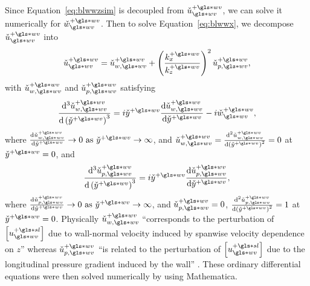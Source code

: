 Since Equation~\eqref{eq:blwwzsim} is decoupled from $\check{u}\pw\ww$, we can solve it numerically for $\check{w}\pw\ww$. Then to solve Equation~\eqref{eq:blwwx}, we decompose $\check{u}\pw\ww$ into
\begin{equation}
	\check{u}\pw\ww = \check{u}\pw_{w,\gls*{wv}}+\left( \frac{k_x\pw}{k_z\pw} \right) ^2\check{u}\pw_{p,\gls*{wv}}
,\end{equation}
with $\check{u}\pw_{w,\gls*{wv}}$ and $\check{u}\pw_{p,\gls*{wv}}$ satisfying
\begin{equation}
\dv[3]{\check{u}\pw_{w,\gls*{wv}}}{\left( \check{y}\pw \right) } =i\check{y}\pw \dv{\check{u}\pw_{w,\gls*{wv}}}{\check{y}\pw} -i\check{w}\pw\ww
,\end{equation}
where $\dv{\check{u}\pw_{w,\gls*{wv}}}{\check{y}\pw} \to 0\text{ as }\check{y}\pw\to\infty$, and $\check{u}\pw_{w,\gls*{wv}}=\dv[2]{\check{u}\pw_{w,\gls*{wv}}}{\left( \check{y}\pw \right) } =0$ at $\check{y}\pw=0$, and
\begin{equation}
	\dv[3]{\check{u}\pw_{p,\gls*{wv}}}{\left( \check{y}\pw \right) } =i\check{y}\pw \dv{\check{u}\pw_{p,\gls*{wv}}}{\check{y}\pw} 
,\end{equation}
where $\dv{\check{u}\pw_{p,\gls*{wv}}}{\check{y}\pw} \to 0\text{ as }\check{y}\pw\to\infty$, and $\check{u}\pw_{p,\gls*{wv}}=0$, $\dv[2]{\check{u}\pw_{p,\gls*{wv}}}{\left( \check{y}\pw \right) } =1 $ at $ \check{y}\pw=0$. Physically $\check{u}\pw_{w,\gls*{wv}}$ ``corresponds to the perturbation of $\left[u\ps\ww\right]$ due to wall-normal velocity induced by spanwise velocity dependence on  $z$'' whereas  $\check{u}\pw_{p,\gls*{wv}}$ ``is related to the perturbation of $\left[ u\ps\ww \right] $ due to the longitudinal pressure gradient induced by the wall'' \cite{chernyshenko2013}. These ordinary differential equations were then solved numerically by \textcite{chernyshenko2013} using Mathematica.


